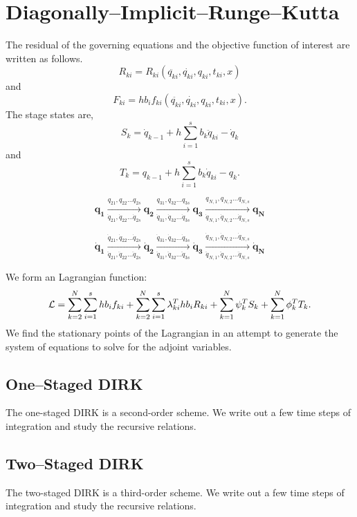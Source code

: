 \documentclass[10pt,letter]{book}
\begin{document}
     \section{Diagonally--Implicit--Runge--Kutta}

     The residual of the governing equations and the objective
     function of interest are written as follows.
     $$R_{ki} = R_{ki}(\ddot{q_{ki}},\dot{q_{ki}},q_{ki},t_{ki}, x)$$
     and 
     $$F_{ki} =  h b_i f_{ki}(\ddot{q_{ki}},\dot{q_{ki}},q_{ki},t_{ki}, x).$$
     The stage states are,
     $$ S_k = \dot{q}_{k-1} + h \sum_{i=1}^s b_k \ddot{q}_{ki} - \dot{q}_{k} $$ and
     $$ T_k = q_{k-1} + h \sum_{i=1}^s b_k \dot{q}_{ki} - q_{k}.$$

     $$\mathbf{q_1} \xrightarrow[\dot{q}_{21},\dot{q}_{22}\ldots\dot{q}_{2s}]{q_{21},q_{22}\ldots q_{2s}} \mathbf{q_2} \xrightarrow[\dot{q}_{31},\dot{q}_{32}\ldots\dot{q}_{3s}]{q_{31},q_{32}\ldots q_{3s}} \mathbf{q_3} \xrightarrow[\dot{q}_{N,1},\dot{q}_{N,2}\ldots\dot{q}_{N,s}]{q_{N,1},q_{N,2}\ldots q_{N,s}} \mathbf{q_N}$$

     $$\mathbf{\dot{q}_1} \xrightarrow[\ddot{q}_{21},\ddot{q}_{22}\ldots\ddot{q}_{2s}]{\dot{q}_{21},\dot{q}_{22}\ldots \dot{q}_{2s}} \mathbf{\dot{q}_2} \xrightarrow[\ddot{q}_{31},\ddot{q}_{32}\ldots\ddot{q}_{3s}]{\dot{q}_{31},\dot{q}_{32}\ldots \dot{q}_{3s}} \mathbf{\dot{q}_3} \xrightarrow[\ddot{q}_{N,1},\ddot{q}_{N,2}\ldots\ddot{q}_{N,s}]{\dot{q}_{N,1},\dot{q}_{N,2}\ldots \dot{q}_{N,s}} \mathbf{\dot{q}_N}$$

     We form an Lagrangian function:
     $$ {\cal{L}} = \sum_{k=2}^{N} \sum_{i=1}^s h b_i f_{ki} +
     \sum_{k=2}^{N} \sum_{i=1}^s\lambda_{ki}^T h b_i R_{ki} +
     \sum_{k=1}^N \psi_k^T S_k + \sum_{k=1}^N \phi_k^T T_k. $$
     We find the stationary points of the Lagrangian in an attempt to
     generate the system of equations to solve for the adjoint variables.

     \subsection{One--Staged DIRK}
     The one-staged DIRK is a second-order scheme. We write out a few
     time steps of integration and study the recursive relations.

     \subsection{Two--Staged DIRK}
     The two-staged DIRK is a third-order scheme. We write out a few
     time steps of integration and study the recursive relations.
\end{document}

